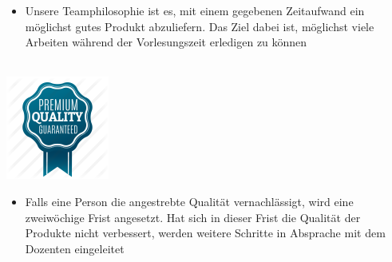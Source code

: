 \begin{itemize}
\item Unsere Teamphilosophie ist es, mit einem gegebenen Zeitaufwand ein möglichst gutes Produkt abzuliefern. Das Ziel dabei ist, möglichst viele Arbeiten während der Vorlesungszeit erledigen zu können\\\\
\end{itemize}

\begin{center}
\includegraphics[scale=0.7]{img/quality}\\
\end{center}

\begin{itemize}
\item Falls eine Person die angestrebte Qualität vernachlässigt, wird eine zweiwöchige Frist angesetzt. Hat sich in dieser Frist die Qualität der Produkte nicht verbessert, werden weitere Schritte in Absprache mit dem Dozenten eingeleitet\\\\
\end{itemize}

